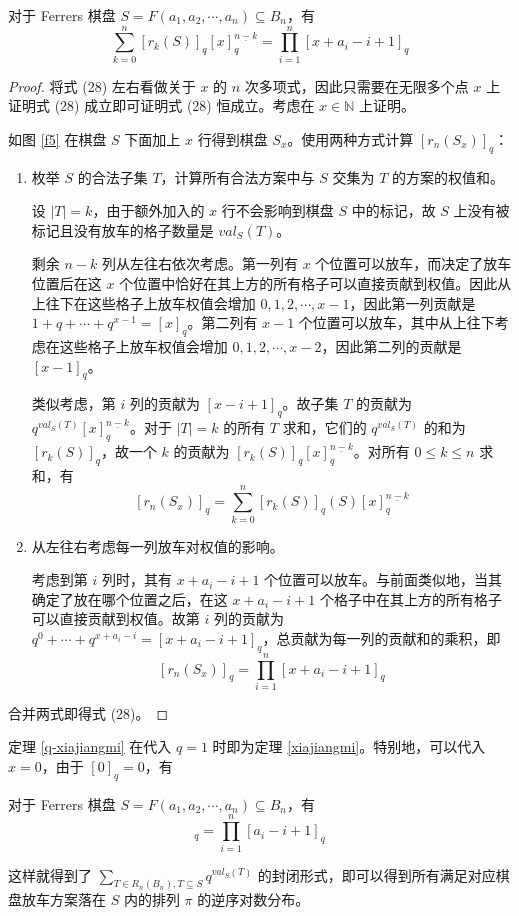 \documentclass{noithesis}
\begin{document}
	\begin{theorem}\label{q-xiajiangmi}
		对于 Ferrers 棋盘 $S = F(a_1,a_2,\cdots,a_n) \subseteq B_n$，有\begin{equation}
		\sum_{k=0}^n [r_k(S)]_q [x]_q^{\underline{n-k}} = \prod_{i=1}^n [x+a_i-i+1]_q
		\end{equation}
	\end{theorem}
	\begin{proof}
		将式 (28) 左右看做关于 $x$ 的 $n$ 次多项式，因此只需要在无限多个点 $x$ 上证明式 (28) 成立即可证明式 (28) 恒成立。考虑在 $x \in \mathbb{N}$ 上证明。
		
		如图 \ref{f5} 在棋盘 $S$ 下面加上 $x$ 行得到棋盘 $S_x$。使用两种方式计算 $[r_n(S_x)]_q$：
		\begin{enumerate}
			\item 枚举 $S$ 的合法子集 $T$，计算所有合法方案中与 $S$ 交集为 $T$ 的方案的权值和。
			
			设 $|T| = k$，由于额外加入的 $x$ 行不会影响到棋盘 $S$ 中的标记，故 $S$ 上没有被标记且没有放车的格子数量是 $val_S(T)$。
			
			剩余 $n-k$ 列从左往右依次考虑。第一列有 $x$ 个位置可以放车，而决定了放车位置后在这 $x$ 个位置中恰好在其上方的所有格子可以直接贡献到权值。因此从上往下在这些格子上放车权值会增加 $0,1,2,\cdots,x-1$，因此第一列贡献是 $1+q+\cdots+q^{x-1} = [x]_q$。第二列有 $x-1$ 个位置可以放车，其中从上往下考虑在这些格子上放车权值会增加 $0,1,2,\cdots,x-2$，因此第二列的贡献是 $[x-1]_q$。
			
			类似考虑，第 $i$ 列的贡献为 $[x-i+1]_q$。故子集 $T$ 的贡献为 $q^{val_S(T)} [x]_q^{\underline{n-k}}$。对于 $|T| = k$ 的所有 $T$ 求和，它们的 $q^{val_S(T)}$ 的和为 $[r_k(S)]_q$，故一个 $k$ 的贡献为 $[r_k(S)]_q[x]_q^{\underline{n-k}}$。对所有 $0 \leq k \leq n$ 求和，有 $$[r_n(S_x)]_q = \sum_{k=0}^n [r_k(S)]_q(S) [x]_q^{\underline{n-k}}$$
			\item 从左往右考虑每一列放车对权值的影响。
			
			考虑到第 $i$ 列时，其有 $x+a_i-i+1$ 个位置可以放车。与前面类似地，当其确定了放在哪个位置之后，在这 $x+a_i-i+1$ 个格子中在其上方的所有格子可以直接贡献到权值。故第 $i$ 列的贡献为 $q^0+\cdots+q^{x+a_i-i} = [x+a_i-i+1]_q$，总贡献为每一列的贡献和的乘积，即 $$[r_n(S_x)]_q = \prod_{i=1}^n [x+a_i-i+1]_q$$
		\end{enumerate}
	
		合并两式即得式 (28)。
	\end{proof}
	
	定理 \ref{q-xiajiangmi} 在代入 $q=1$ 时即为定理 \ref{xiajiangmi}。特别地，可以代入 $x=0$，由于 $[0]_q = 0$，有
	\begin{lemma}[\cite{1986Q}]
		对于 Ferrers 棋盘 $S = F(a_1,a_2,\cdots,a_n) \subseteq B_n$，有\begin{equation}
		[r_n(S)]_q = \prod_{i=1}^n [a_i-i+1]_q
		\end{equation}
	\end{lemma}
	这样就得到了 $\sum_{T \in R_n(B_n),T \subseteq S} q^{val_S(T)}$ 的封闭形式，即可以得到所有满足对应棋盘放车方案落在 $S$ 内的排列 $\pi$ 的逆序对数分布。
	
\end{document}

